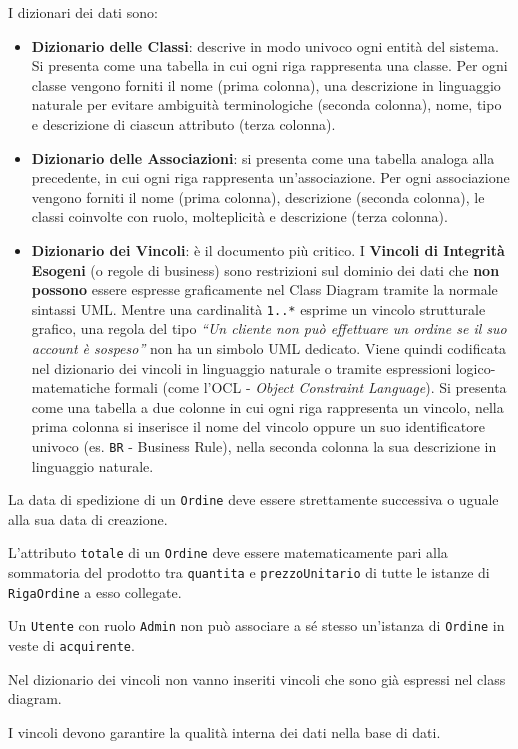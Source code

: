 I dizionari dei dati sono: 
\begin{itemize}
    \item \textbf{Dizionario delle Classi}: descrive in modo univoco ogni entità del sistema. Si presenta come una tabella in cui ogni riga rappresenta una classe. Per ogni classe vengono forniti il nome (prima colonna), una descrizione in linguaggio naturale per evitare ambiguità terminologiche (seconda colonna), nome, tipo e descrizione di ciascun attributo (terza colonna).
    \item \textbf{Dizionario delle Associazioni}: si presenta come una tabella analoga alla precedente, in cui ogni riga rappresenta un'associazione. Per ogni associazione vengono forniti il nome (prima colonna), descrizione (seconda colonna), le classi coinvolte con ruolo, molteplicità e descrizione (terza colonna). 
    \item \textbf{Dizionario dei Vincoli}: è il documento più critico. I \textbf{Vincoli di Integrità Esogeni} (o regole di business) sono restrizioni sul dominio dei dati che \textbf{non possono} essere espresse graficamente nel Class Diagram tramite la normale sintassi UML. Mentre una cardinalità \texttt{1..*} esprime un vincolo strutturale grafico, una regola del tipo \textit{``Un cliente non può effettuare un ordine se il suo account è sospeso''} non ha un simbolo UML dedicato. Viene quindi codificata nel dizionario dei vincoli in linguaggio naturale o tramite espressioni logico-matematiche formali (come l'OCL - \textit{Object Constraint Language}). Si presenta come una tabella a due colonne in cui ogni riga rappresenta un vincolo, nella prima colonna si inserisce il nome del vincolo oppure un suo identificatore univoco (es. \texttt{BR} - Business Rule), nella seconda colonna la sua descrizione in linguaggio naturale. 
\end{itemize}

\begin{example}
\begin{description}
    \item 
    \item[\texttt{BR01} (Coerenza Temporale):] La data di spedizione di un \texttt{Ordine} deve essere strettamente successiva o uguale alla sua data di creazione.
    \item[\texttt{BR02} (Integrità Finanziaria):] L'attributo \texttt{totale} di un \texttt{Ordine} deve essere matematicamente pari alla sommatoria del prodotto tra \texttt{quantita} e \texttt{prezzoUnitario} di tutte le istanze di \texttt{RigaOrdine} a esso collegate.
    \item[\texttt{BR03} (Regola di Business):] Un \texttt{Utente} con ruolo \texttt{Admin} non può associare a sé stesso un'istanza di \texttt{Ordine} in veste di \texttt{acquirente}.
\end{description}
\end{example}

\begin{bestpractice}[]
    Nel dizionario dei vincoli non vanno inseriti vincoli che sono già espressi nel class diagram. 

    I vincoli devono garantire la qualità interna dei dati nella base di dati. 
\end{bestpractice}




